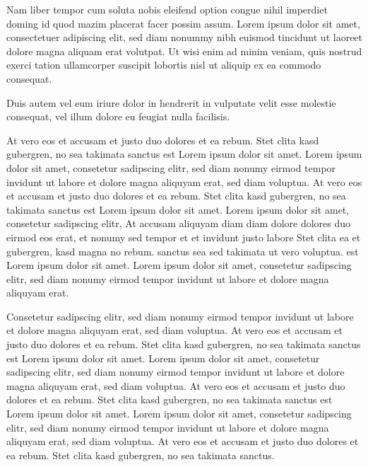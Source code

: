 Nam liber tempor cum soluta nobis eleifend option congue nihil imperdiet doming id quod mazim placerat facer possim assum. Lorem ipsum dolor sit amet, consectetuer adipiscing elit, sed diam nonummy nibh euismod tincidunt ut laoreet dolore magna aliquam erat volutpat. Ut wisi enim ad minim veniam, quis nostrud exerci tation ullamcorper suscipit lobortis nisl ut aliquip ex ea commodo consequat.   

Duis autem vel eum iriure dolor in hendrerit in vulputate velit esse molestie consequat, vel illum dolore eu feugiat nulla facilisis.   

At vero eos et accusam et justo duo dolores et ea rebum. Stet clita kasd gubergren, no sea takimata sanctus est Lorem ipsum dolor sit amet. Lorem ipsum dolor sit amet, consetetur sadipscing elitr, sed diam nonumy eirmod tempor invidunt ut labore et dolore magna aliquyam erat, sed diam voluptua. At vero eos et accusam et justo duo dolores et ea rebum. Stet clita kasd gubergren, no sea takimata sanctus est Lorem ipsum dolor sit amet. Lorem ipsum dolor sit amet, consetetur sadipscing elitr, At accusam aliquyam diam diam dolore dolores duo eirmod eos erat, et nonumy sed tempor et et invidunt justo labore Stet clita ea et gubergren, kasd magna no rebum. sanctus sea sed takimata ut vero voluptua. est Lorem ipsum dolor sit amet. Lorem ipsum dolor sit amet, consetetur sadipscing elitr, sed diam nonumy eirmod tempor invidunt ut labore et dolore magna aliquyam erat.   

Consetetur sadipscing elitr, sed diam nonumy eirmod tempor invidunt ut labore et dolore magna aliquyam erat, sed diam voluptua. At vero eos et accusam et justo duo dolores et ea rebum. Stet clita kasd gubergren, no sea takimata sanctus est Lorem ipsum dolor sit amet. Lorem ipsum dolor sit amet, consetetur sadipscing elitr, sed diam nonumy eirmod tempor invidunt ut labore et dolore magna aliquyam erat, sed diam voluptua. At vero eos et accusam et justo duo dolores et ea rebum. Stet clita kasd gubergren, no sea takimata sanctus est Lorem ipsum dolor sit amet. Lorem ipsum dolor sit amet, consetetur sadipscing elitr, sed diam nonumy eirmod tempor invidunt ut labore et dolore magna aliquyam erat, sed diam voluptua. At vero eos et accusam et justo duo dolores et ea rebum. Stet clita kasd gubergren, no sea takimata sanctus.   


